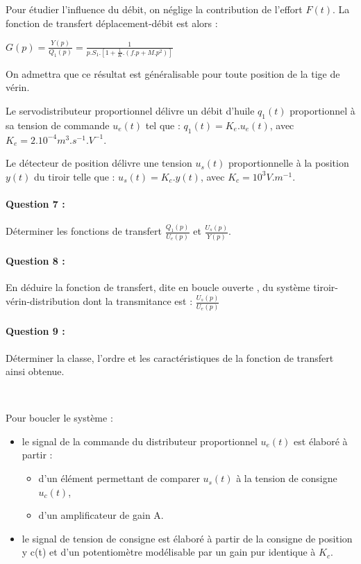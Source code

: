 Pour étudier l'influence du débit, on néglige la contribution de l'effort $F(t)$. La fonction de transfert déplacement-débit est alors :

$G(p)=\frac{Y(p)}{Q_1(p)}=\frac{1}{p.S_1.\left[1+\frac{1}{K}.(f.p+M.p^2)\right]}$

On admettra que ce résultat est généralisable pour toute position de la tige de vérin.

Le servodistributeur proportionnel délivre un débit d'huile $q_1(t)$ proportionnel à sa tension de commande $u_e(t)$ tel que : $q_1(t)=K_e.u_e(t)$, avec $K_e=2.10^{-4}m^3.s^{-1}.V^{-1}$.

Le détecteur de position délivre une tension $u_s(t)$ proportionnelle à la position $y(t)$ du tiroir telle que : $u_s(t)=K_c.y(t)$, avec $K_c=10^3V.m^{-1}$.

\paragraph{Question 7 :} Déterminer les fonctions de transfert $\frac{Q_1(p)}{U_e(p)}$ et $\frac{U_s(p)}{Y(p)}$.

\paragraph{Question 8 :} En déduire la fonction de transfert, dite \og en boucle ouverte \fg, du système tiroir-vérin-distribution dont la transmitance est : $\frac{U_s(p)}{U_e(p)}$

\paragraph{Question 9 :} Déterminer la classe, l'ordre et les caractéristiques de la fonction de transfert ainsi obtenue.

~\

Pour boucler le système :
\begin{itemize}
 \item le signal de la commande du distributeur proportionnel $u_e(t)$ est élaboré à partir :
 \begin{itemize}
  \item d'un élément permettant de comparer $u_s(t)$ à la tension de consigne $u_c(t)$,
  \item d'un amplificateur de gain A.
 \end{itemize}
 \item le signal de tension de consigne est élaboré à partir de la consigne de position y c(t) et d'un potentiomètre modélisable par un gain pur identique à $K_c$.%
\end{itemize}

